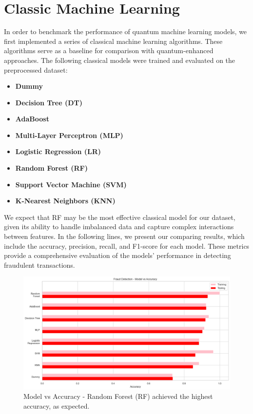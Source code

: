 \documentclass[10pt]{article}
\begin{document}
\section{Classic Machine Learning}
In order to benchmark the performance of quantum machine learning models, we first implemented a series of classical machine learning algorithms. These algorithms serve as a baseline for comparison with quantum-enhanced approaches. The following classical models were trained and evaluated on the preprocessed dataset:
\begin{itemize}
	\item \textbf{Dummy}
	\item \textbf{Decision Tree (DT)}
	\item \textbf{AdaBoost}
	\item \textbf{Multi-Layer Perceptron (MLP)}
	\item \textbf{Logistic Regression (LR)}
	\item \textbf{Random Forest (RF)}
	\item \textbf{Support Vector Machine (SVM)}
	\item \textbf{K-Nearest Neighbors (KNN)}
\end{itemize}
We expect that RF may be the most effective classical model for our dataset, given its ability to handle imbalanced data and capture complex interactions between features. In the following lines, we present our comparing results, which include the accuracy, precision, recall, and F1-score for each model. These metrics provide a comprehensive evaluation of the models' performance in detecting fraudulent transactions.
\begin{figure}[H]
	\centering
	\includegraphics[height = 0.40\textheight]{img/fraud_detection_model_accuracy.png}
	\caption{Model vs Accuracy - Random Forest (RF) achieved the highest accuracy, as expected.}
\end{figure}
\end{document}
